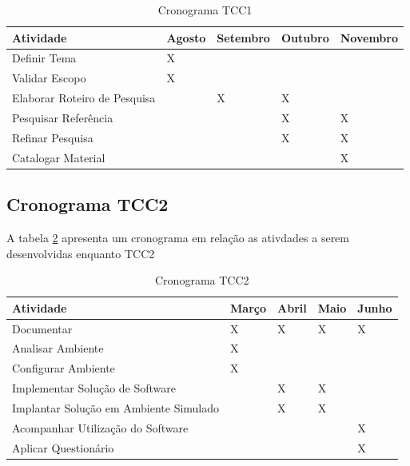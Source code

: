 \begin{table}[h]
\centering
\caption{Cronograma TCC1}
\label{cronograma_tcc1}
\begin{tabular}{lllll}
\textbf{Atividade}           & \textbf{Agosto} & \textbf{Setembro} & \textbf{Outubro} & \textbf{Novembro} \\ \hline
Definir Tema                 & X               &                   &                  &                   \\ \hline
Validar Escopo               & X               &                   &                  &                   \\ \hline
Elaborar Roteiro de Pesquisa &                 & X                 & X                &                   \\ \hline
Pesquisar Referência         &                 &                   & X                & X                 \\ \hline
Refinar Pesquisa             &                 &                   & X                & X                 \\ \hline
Catalogar Material           &                 &                   &                  & X                 \\ \hline
\end{tabular}
\end{table}

\subsection{Cronograma TCC2}
A tabela \ref{cronograma_tcc2} apresenta um cronograma em relação as ativdades a serem desenvolvidas enquanto TCC2
\begin{table}[h]
\centering
\caption{Cronograma TCC2}
\label{cronograma_tcc2}
\begin{tabular}{lllll}
\textbf{Atividade}                     & \textbf{Março} & \textbf{Abril} & \textbf{Maio} & \textbf{Junho} \\ \hline
Documentar                             & X              & X              & X             & X              \\ \hline
Analisar Ambiente                      & X              &                &               &                \\ \hline
Configurar Ambiente                    & X              &                &               &                \\ \hline
Implementar Solução de Software        &                & X              & X             &                \\ \hline
Implantar Solução em Ambiente Simulado &                & X              & X             &                \\ \hline
Acompanhar Utilização do Software      &                &                &               & X              \\ \hline
Aplicar Questionário                   &                &                &               & X              \\ \hline
\end{tabular}
\end{table}

